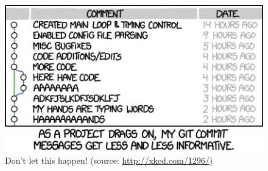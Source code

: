 \documentclass[12pt,letterpaper]{article}
\begin{document}
\begin{figure}[!h]
	\centering
	\includegraphics[width=0.7\linewidth]{figs/xkcd_git_commit}
	\caption{Don't let this happen!  (source: \url{http://xkcd.com/1296/})}
	\label{fig:commit_messages}
\end{figure}

\clearpage


\end{document}
